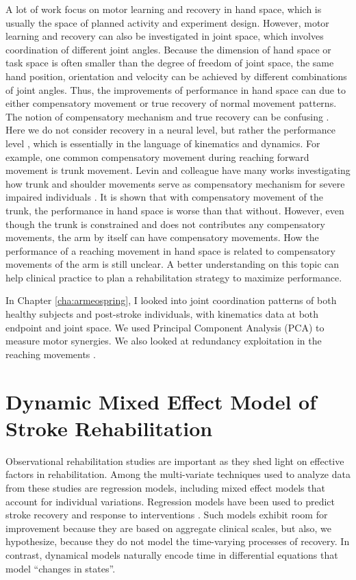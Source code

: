 A lot of work \cite{Dipietro2009} focus on motor learning and recovery in hand space, which is usually the space of planned activity and experiment design. 
However, motor learning and recovery can also be investigated in joint space, which involves coordination of different joint angles. 
Because the dimension of hand space or task space is often smaller than the degree of freedom of joint space, the same hand position, orientation and velocity can be achieved by different combinations of joint angles. 
Thus, the improvements of performance in hand space can due to either compensatory movement or true recovery \cite{Cirstea2000, Levin2002, Shaikh2014} of normal movement patterns.
The notion of compensatory mechanism and true recovery can be confusing \cite{Levin2009}. 
Here we do not consider recovery in a neural level, but rather the performance level \cite{Levin2009}, which is essentially in the language of kinematics and dynamics. 
For example, one common compensatory movement during reaching forward movement is trunk movement. 
Levin and colleague have many works investigating how trunk and shoulder movements serve as compensatory mechanism for severe impaired individuals \cite{Cirstea2000}. 
It is shown that with compensatory movement of the trunk, the performance in hand space is worse than that without. 
However, even though the trunk is constrained and does not contributes any compensatory movements, the arm by itself can have compensatory movements. 
How the performance of a reaching movement in hand space is related to compensatory movements of the arm is still unclear. 
A better understanding on this topic can help clinical practice to plan a rehabilitation strategy to maximize performance.

In Chapter \ref{cha:armeospring}, I looked into joint coordination patterns of both healthy subjects and post-stroke individuals, with kinematics data at both endpoint and joint space. 
We used Principal Component Analysis (PCA) to measure motor synergies.
We also looked at redundancy exploitation in the reaching movements \cite{Singh2016}.

\section{Dynamic Mixed Effect Model of Stroke Rehabilitation}
Observational rehabilitation studies are important as they shed light on effective factors in rehabilitation.
Among the multi-variate techniques used to analyze data from these studies are regression models, including mixed effect models that account for individual variations. 
Regression models have been used to predict stroke recovery \cite{Johnston2000} and response to interventions \cite{Stinear2006}.
Such models exhibit room for improvement because they are based on aggregate clinical scales, but also, we hypothesize, because they do not model the time-varying processes of recovery. 
In contrast, dynamical models naturally encode time in differential equations that model “changes in states”. 


